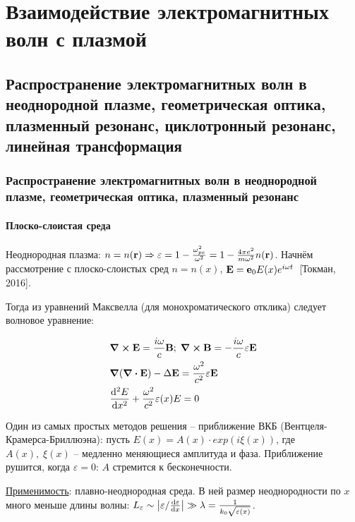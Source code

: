 \documentclass[10pt, a4paper]{article}
\newcommand{\Tokman}{~[Токман, 2016]}
\let\stdsection\section
\renewcommand\section{\newpage\stdsection}
\begin{document}
\section{Взаимодействие электромагнитных волн с плазмой}

\subsection{Распространение электромагнитных волн в неоднородной плазме, геометрическая оптика, плазменный резонанс, циклотронный резонанс, линейная трансформация}

\subsubsection{Распространение электромагнитных волн в неоднородной плазме, геометрическая оптика, плазменный резонанс}

\paragraph{Плоско-слоистая среда}

Неоднородная плазма: $n = n(\vb{r})\Rightarrow\varepsilon = 1-\frac{\omega_{pe}^2}{\omega^2} = 1-\frac{4\pi e^2}{m\omega^2}n(\vb{r})$. Начнём рассмотрение с плоско-слоистых сред $n = n(x)$, $\vb{E} = \vb{e}_0E(x)e^{i\omega t}$\Tokman.

Тогда из уравнений Максвелла (для монохроматического отклика) следует волновое уравнение:

\begin{align*}
	&\curl{\vb{E}} = \frac{i\omega}{c}\vb{B};\;\curl{\vb{B}} = -\frac{i\omega}{c}\vb{\varepsilon\vb{E}}\\
	&\grad{(\div{\vb{E}})}-\Delta \vb{E} = \frac{\omega^2}{c^2}\varepsilon\vb{E}\\
	&\dv[2]{E}{x} + \frac{\omega^2}{c^2} \varepsilon(x) E = 0	
\end{align*}

Один из самых простых методов решения -- приближение ВКБ (Вентцеля-Крамерса-Бриллюэна): пусть $E(x) = A(x)\cdot exp(i \xi(x))$, где $A(x),\;\xi(x)$ -- медленно меняющиеся амплитуда и фаза. Приближение рушится, когда $\varepsilon = 0$: $A$ стремится к бесконечности.

\uline{Применимость}: плавно-неоднородная среда. В ней размер неоднородности по $x$ много меньше длины волны: $L_{\varepsilon} \sim \abs{\varepsilon/\dv{\varepsilon}{x}} \gg \lambda = \frac{1}{k_0 \sqrt{\varepsilon(x)}}$.
\end{document}
